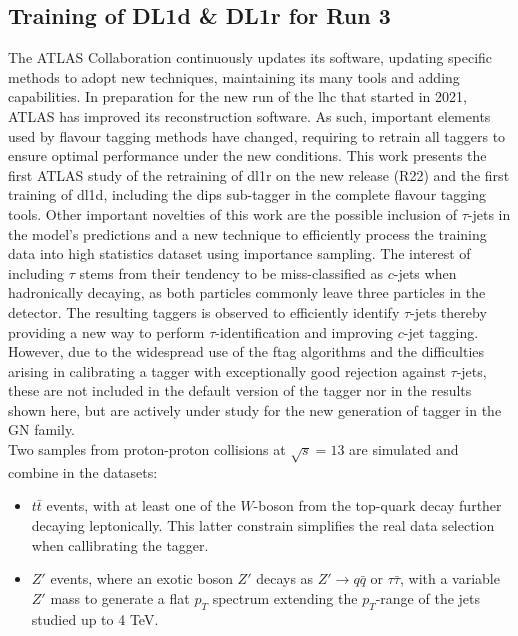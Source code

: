 \subsection{Training of DL1d \& DL1r for Run 3}
The ATLAS Collaboration continuously updates its software, updating specific methods to adopt new techniques, maintaining its many tools and adding capabilities. In preparation for the new run of the \gls{lhc} that started in 2021, ATLAS has improved its reconstruction software. As such, important elements used by flavour tagging methods have changed, requiring to retrain all taggers to ensure optimal performance under the new conditions. This work presents the first ATLAS study of the retraining of \gls{dl1r} on the new release (R22) and the first training of \gls{dl1d}, including the \gls{dips} sub-tagger in the complete flavour tagging tools. Other important novelties of this work are the possible inclusion of $\tau$-jets in the model's predictions and a new technique to efficiently process the training data into high statistics dataset using importance sampling. The interest of including $\tau$ stems from their tendency to be miss-classified as $c$-jets when hadronically decaying, as both particles commonly leave three particles in the detector. The resulting taggers is observed to efficiently identify $\tau$-jets thereby providing a new way to perform $\tau$-identification and improving $c$-jet tagging. However, due to the widespread use of the \gls{ftag} algorithms and the difficulties arising in calibrating a tagger with exceptionally good rejection against $\tau$-jets, these are not included in the default version of the tagger nor in the results shown here, but are actively under study for the new generation of tagger in the GN family. \\ 

Two samples from proton-proton collisions at $\sqrt{s} = 13$ are simulated and combine in the datasets:
\begin{itemize}
\item $t\bar{t}$ events, with at least one of the $W$-boson from the top-quark decay further decaying leptonically. This latter constrain simplifies the real data selection when callibrating the tagger.
\item $Z'$ events, where an exotic boson $Z'$ decays as $Z' \rightarrow q\bar{q} \textrm{ or } \tau \bar{\tau}$, with a variable $Z'$ mass to generate a flat $p_T$ spectrum extending the $p_T$-range of the jets studied up to 4 TeV.
\end{itemize}

